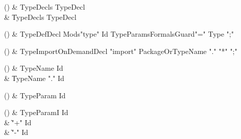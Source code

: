 \begin{bbgrammarappendix}

() & TypeDecls \label{prod:TypeDecls}  \: TypeDecl  \\

 &    \| TypeDecls TypeDecl \\

\end{bbgrammarappendix}

\begin{bbgrammarappendix}

() & TypeDefDecl \label{prod:TypeDefDecl}  \: Mods\opt \xcd"type" Id TypeParams\opt Formals\opt Guard\opt \xcd"=" Type \xcd";"  \\


\end{bbgrammarappendix}

\begin{bbgrammarappendix}

() & TypeImportOnDemandDecl \label{prod:TypeImportOnDemandDecl}  \: \xcd"import" PackageOrTypeName \xcd"." \xcd"*" \xcd";"  \\


\end{bbgrammarappendix}

\begin{bbgrammarappendix}

() & TypeName \label{prod:TypeName}  \: Id  \\

 &    \| TypeName \xcd"." Id \\

\end{bbgrammarappendix}

\begin{bbgrammarappendix}

() & TypeParam \label{prod:TypeParam}  \: Id  \\


\end{bbgrammarappendix}

\begin{bbgrammarappendix}

() & TypeParamI \label{prod:TypeParamI}  \: Id  \\

 &    \| \xcd"+" Id \\
 &    \| \xcd"-" Id \\

\end{bbgrammarappendix}

